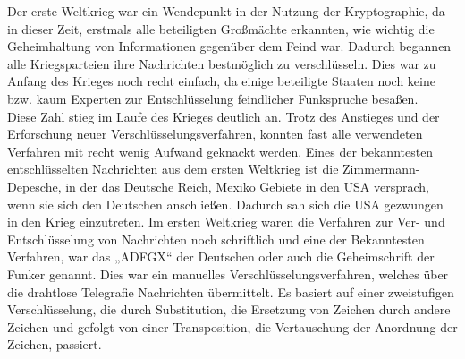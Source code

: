 Der erste Weltkrieg war ein Wendepunkt in der Nutzung der Kryptographie, da in dieser Zeit, erstmals alle beteiligten Großmächte erkannten, wie wichtig die Geheimhaltung von Informationen gegenüber dem Feind war. Dadurch begannen alle Kriegsparteien ihre Nachrichten bestmöglich zu verschlüsseln. Dies war zu Anfang des Krieges noch recht einfach, da einige beteiligte Staaten noch keine bzw. kaum Experten zur Entschlüsselung feindlicher Funkspruche besaßen.\\



Diese Zahl stieg im Laufe des Krieges deutlich an. Trotz des Anstieges und der Erforschung neuer Verschlüsselungsverfahren, konnten fast alle verwendeten Verfahren mit recht wenig Aufwand geknackt werden. Eines der bekanntesten entschlüsselten Nachrichten aus dem ersten Weltkrieg ist die Zimmermann-Depesche, in der das Deutsche Reich, Mexiko Gebiete in den USA versprach, wenn sie sich den Deutschen anschließen. Dadurch sah sich die USA gezwungen in den Krieg einzutreten. Im ersten Weltkrieg waren die Verfahren zur Ver- und Entschlüsselung von Nachrichten noch schriftlich und eine der Bekanntesten Verfahren, war das „ADFGX“ der Deutschen oder auch die Geheimschrift der Funker genannt. Dies war ein manuelles Verschlüsselungsverfahren, welches über die drahtlose Telegrafie Nachrichten übermittelt. Es basiert auf einer zweistufigen Verschlüsselung, die durch Substitution, die Ersetzung von Zeichen durch andere Zeichen und gefolgt von einer Transposition, die Vertauschung der Anordnung der Zeichen, passiert.\\

